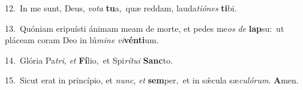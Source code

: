{\numbfont\textcolor{\numbcolor}{12.}}~In me sunt, Deus, \textit{vo}\-\textit{ta} \textbf{tu}\-a,~\star quæ reddam, lauda\-\textit{ti}\-\textit{ó}\textit{nes} \textbf{ti}\-bi.\par
{\numbfont\textcolor{\numbcolor}{13.}}~Quóniam eripuísti ánimam meam de morte, et pedes me\textit{os} \textit{de} \textbf{lap}\-su:~\star ut pláceam coram Deo in lú\-\textit{mi}\-\textit{ne} \textit{vi}\-\textbf{vén}\textbf{ti}um.\par
{\numbfont\textcolor{\numbcolor}{14.}}~Glória Pa\-\textit{tri}\-, \textit{et} \textbf{Fí}\-lio,~\star et Spi\-\textit{rí}\-\textit{tu}\textit{i} \textbf{Sanc}\-to.\par
{\numbfont\textcolor{\numbcolor}{15.}}~Sicut erat in princípio, et \textit{nunc}\-, \textit{et} \textbf{sem}\-per,~\star et in sǽcula sæ\-\textit{cu}\-\textit{ló}\textit{rum}. \textbf{A}\-men.\par
